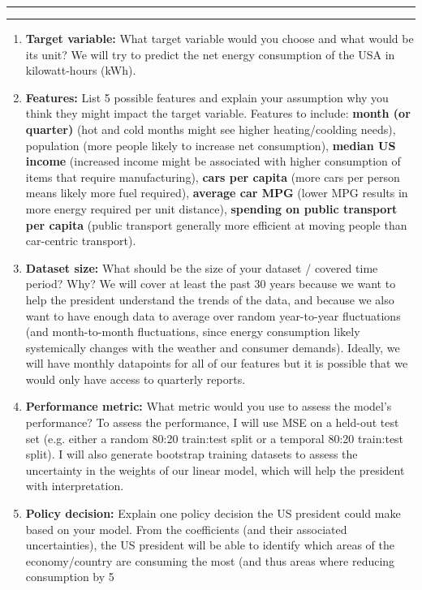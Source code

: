\documentclass[submit]{harvardml}
\newcommand{\question}[2] {\vspace{.25in} \hrule\vspace{0.5em}
\noindent{\bf #1: #2} \vspace{0.5em}
\hrule \vspace{.10in}}
\begin{document}
\newpage
\question{4}{Impact Question}

\begin{enumerate}

  \item \textbf{Target variable:} What target variable would you choose and what would be its unit? 
  \subitem We will try to predict the net energy consumption of the USA in kilowatt-hours (kWh).
  \item \textbf{Features:}  List 5 possible features and explain your assumption why you think they might impact the target variable. 
    \subitem Features to include: \textbf{month (or quarter)} (hot and cold months might see higher heating/coolding needs), population (more people likely to increase net consumption), \textbf{median US income} (increased income might be associated with higher consumption of items that require manufacturing), \textbf{cars per capita} (more cars per person means likely more fuel required), \textbf{average car MPG} (lower MPG results in more energy required per unit distance), \textbf{spending on public transport per capita} (public transport generally more efficient at moving people than car-centric transport).
  \item \textbf{Dataset size:} What should be the size of your dataset / covered time period? Why? 
    \subitem We will cover at least the past 30 years because we want to help the president understand the trends of the data, and because we also want to have enough data to average over random year-to-year fluctuations (and month-to-month fluctuations, since energy consumption likely systemically changes with the weather and consumer demands). Ideally, we will have monthly datapoints for all of our features but it is possible that we would only have access to quarterly reports.
  \item \textbf{Performance metric:} What metric would you use to assess the model’s performance? 
    \subitem To assess the performance, I will use MSE on a held-out test set (e.g. either a random 80:20 train:test split or a temporal 80:20 train:test split). I will also generate bootstrap training datasets to assess the uncertainty in the weights of our linear model, which will help the president with interpretation.
  \item \textbf{Policy decision:} Explain one policy decision the US president could make based on your model. 
    \subitem From the coefficients (and their associated uncertainties), the US president will be able to identify which areas of the economy/country are consuming the most (and thus areas where reducing consumption by 5%

\end{enumerate}
\end{document}
